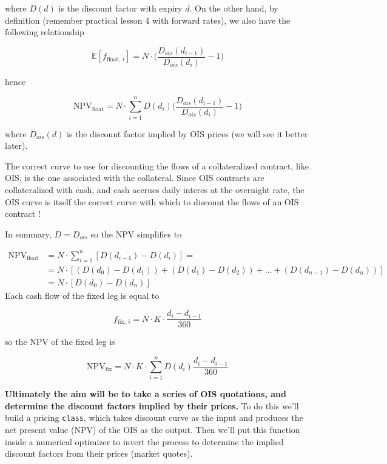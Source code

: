 \documentclass[11pt]{article}
\begin{document}
where \(D(d)\) is the discount factor with expiry \(d\). On the other
hand, by definition (remember practical lesson 4 with forward rates), we
also have the following relationship

\[\mathbb{E}[f_{\mathrm{float},~i}] = N\cdot\Big(\frac{D_{ois}(d_{i-1})}{D_{ois}(d_{i})} - 1\Big) \]

hence

\[\mathrm{NPV}_{\mathrm{float}} = N\cdot \sum_{i=1}^{n}D(d_i) \Big(\frac{D_{ois}(d_{i-1})}{D_{ois}(d_{i})} - 1\Big) \]

where \(D_{ois}(d)\) is the discount factor implied by OIS prices (we
will see it better later).

The correct curve to use for discounting the flows of a collateralized
contract, like OIS, is the one associated with the collateral. Since OIS
contracts are collateralized with cash, and cash accrues daily interes
at the overnight rate, the OIS curve is itself the correct curve with
which to discount the flows of an OIS contract !

In summary, \(D = D_{ois}\) so the NPV simplifies to

\begin{equation}
  \begin{split}
    \mathrm{NPV}_{\mathrm{float}} & = N\cdot\sum_{i=1}^{n}[D(d_{i-1}) - D(d_i)] =  \\
    &= N\cdot[(D(d_{0}) - D(d_{1})) + (D(d_{1}) - D(d_{2})) + ... + (D(d_{n-1}) - D(d_{n}))]\\
    &= N \cdot [D(d_0) - D(d_n)]
  \end{split}
\end{equation}
Each cash flow of the fixed leg is equal to

\[f_{\mathrm{fix},~i}=N\cdot K\cdot \frac{d_i - d_{i-1}}{360}\]

so the NPV of the fixed leg is

\[\mathrm{NPV}_{\mathrm{fix}} = N\cdot K\cdot \sum_{i=1}^{n}D(d_{i})\frac{d_i - d_{i-1}}{360}\]

\textbf{Ultimately the aim will be to take a series of OIS quotations,
and determine the discount factors implied by their prices.} To do this
we'll build a pricing \texttt{class}, which takes discount curve as the
input and produces the net present value (NPV) of the OIS as the output.
Then we'll put this function inside a numerical optimizer to invert the
process to determine the implied discount factors from their prices
(market quotes).
\end{document}

